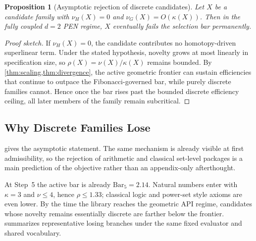 \documentclass[11pt,a4paper]{article}
\theoremstyle{plain}
\newtheorem{proposition}[theorem]{Proposition}
\theoremstyle{definition}
\theoremstyle{remark}
\begin{document}
\begin{proposition}[Asymptotic rejection of discrete candidates]
\label{prop:discrete-asymptote-main}
Let $X$ be a candidate family with $\nu_H(X)=0$ and $\nu_G(X)=O(\kappa(X))$.
Then in the fully coupled $d=2$ PEN regime, $X$ eventually fails the selection bar permanently.
\end{proposition}

\begin{proof}[Proof sketch]
If $\nu_H(X)=0$, the candidate contributes no homotopy-driven superlinear term.
Under the stated hypothesis, novelty grows at most linearly in specification size, so $\rho(X)=\nu(X)/\kappa(X)$ remains bounded.
By \cref{thm:scaling,thm:divergence}, the active geometric frontier can sustain efficiencies that continue to outpace the Fibonacci-governed bar, while purely discrete families cannot.
Hence once the bar rises past the bounded discrete efficiency ceiling, all later members of the family remain subcritical.
\end{proof}

\subsection{Why Discrete Families Lose}
\label{sec:discrete-frontier}

 gives the asymptotic statement. The same mechanism is already visible at first admissibility, so the rejection of arithmetic and classical set-level packages is a main prediction of the objective rather than an appendix-only afterthought.

At Step~5 the active bar is already $\mathrm{Bar}_5 = 2.14$. Natural numbers enter with $\kappa=3$ and $\nu \le 4$, hence $\rho \le 1.33$; classical logic and power-set style axioms are even lower. By the time the library reaches the geometric API regime, candidates whose novelty remains essentially discrete are farther below the frontier.  summarizes representative losing branches under the same fixed evaluator and shared vocabulary.
\end{document}
